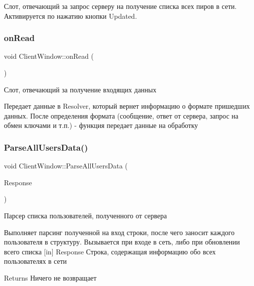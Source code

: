 Слот, отвечающий за запрос серверу на получение списка всех пиров в сети. Активируется по нажатию кнопки Updated. 

\mbox{\label{class_client_window_a6af59313228995e6c55d265db7ce3995}} 
\subsubsection{\texorpdfstring{on\+Read}{onRead}}
{\footnotesize\ttfamily void Client\+Window\+::on\+Read (\begin{DoxyParamCaption}{ }\end{DoxyParamCaption})\hspace{0.3cm}{\ttfamily [slot]}}



Слот, отвечающий за получение входящих данных 

Передает данные в Resolver, который вернет информацию о формате пришедших данных. После определения формата (сообщение, ответ от сервера, запрос на обмен ключами и т.\+п.) -\/ функция передает данные на обработку \mbox{\label{class_client_window_adef4d0491b4ac3d7f4066acfef0841c4}} 
\subsubsection{\texorpdfstring{Parse\+All\+Users\+Data()}{ParseAllUsersData()}}
{\footnotesize\ttfamily void Client\+Window\+::\+Parse\+All\+Users\+Data (\begin{DoxyParamCaption}\item[{Q\+String}]{Response }\end{DoxyParamCaption})\hspace{0.3cm}{\ttfamily [private]}}



Парсер списка пользователей, полученного от сервера 

Выполняет парсинг полученной на вход строки, после чего заносит каждого пользователя в структуру. Вызывается при входе в сеть, либо при обновлении всего списка \mbox{[}in\mbox{]} Response Строка, содержащая информацию обо всех пользователях в сети \begin{DoxyReturn}{Returns}
Ничего не возвращает 
\end{DoxyReturn}
\mbox{\label{class_client_window_af38cd3b6f4d7e7ab2c805460a95d3172}} 
